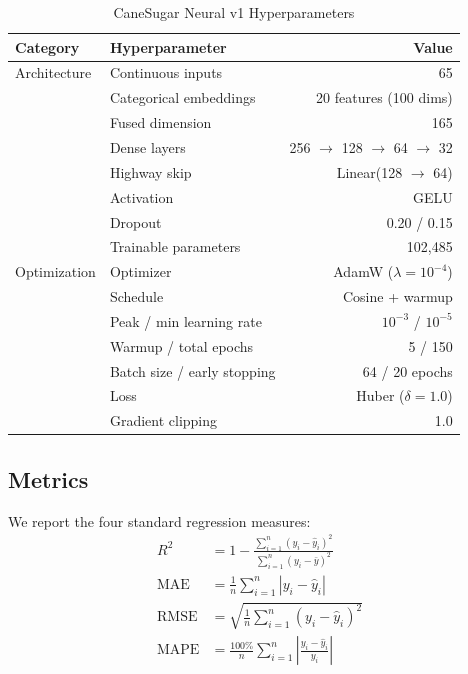 \documentclass[conference,10pt,letterpaper]{IEEEtran}
\begin{document}
\begin{table}[htbp]
\caption{CaneSugar Neural v1 Hyperparameters}
\label{tab:hyperparams}
\centering
\footnotesize
\setlength{\tabcolsep}{4pt}
\begin{tabular*}{\columnwidth}{@{\extracolsep{\fill}}llr@{}}
\toprule
\textbf{Category} & \textbf{Hyperparameter} & \textbf{Value} \\
\midrule
Architecture & Continuous inputs               & 65 \\
             & Categorical embeddings          & 20 features (100 dims) \\
             & Fused dimension                 & 165 \\
             & Dense layers                    & 256 $\to$ 128 $\to$ 64 $\to$ 32 \\
             & Highway skip                    & Linear(128 $\to$ 64) \\
             & Activation                      & GELU \\
             & Dropout                         & 0.20 / 0.15 \\
             & Trainable parameters            & 102,485 \\
\midrule
Optimization & Optimizer                       & AdamW ($\lambda = 10^{-4}$) \\
             & Schedule                        & Cosine + warmup \\
             & Peak / min learning rate        & $10^{-3}$ / $10^{-5}$ \\
             & Warmup / total epochs           & 5 / 150 \\
             & Batch size / early stopping     & 64 / 20 epochs \\
             & Loss                            & Huber ($\delta = 1.0$) \\
             & Gradient clipping               & 1.0 \\
\bottomrule
\end{tabular*}
\end{table}

\subsection{Metrics}
We report the four standard regression measures:
\begin{align}
R^2 &= 1 - \frac{\sum_{i=1}^n (y_i - \hat{y}_i)^2}{\sum_{i=1}^n (y_i - \bar{y})^2} \\
\text{MAE} &= \frac{1}{n} \sum_{i=1}^n |y_i - \hat{y}_i| \\
\text{RMSE} &= \sqrt{\frac{1}{n} \sum_{i=1}^n (y_i - \hat{y}_i)^2} \\
\text{MAPE} &= \frac{100\%}{n} \sum_{i=1}^n \left|\frac{y_i - \hat{y}_i}{y_i}\right|
\end{align}
\end{document}
